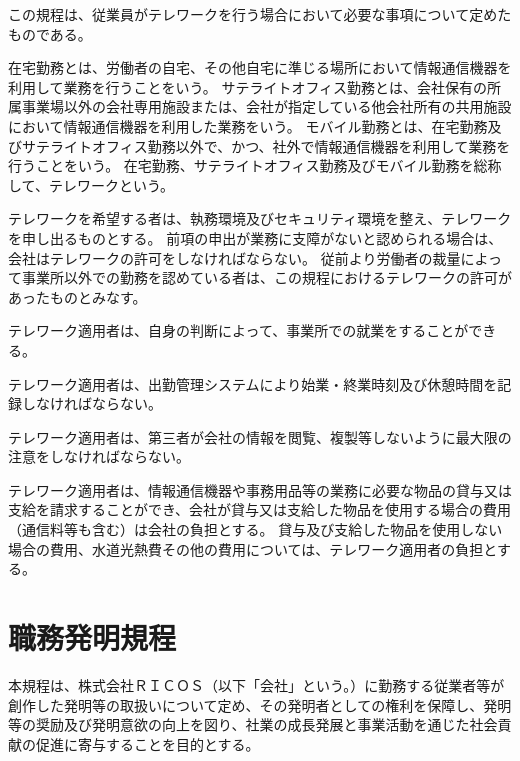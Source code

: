 \documentclass[10pt,a4paper,uplatex]{jsarticle}
\begin{document}
この規程は、従業員がテレワークを行う場合において必要な事項について定めたものである。

在宅勤務とは、労働者の自宅、その他自宅に準じる場所において情報通信機器を利用して業務を行うことをいう。
\term サテライトオフィス勤務とは、会社保有の所属事業場以外の会社専用施設または、会社が指定している他会社所有の共用施設において情報通信機器を利用した業務をいう。
\term モバイル勤務とは、在宅勤務及びサテライトオフィス勤務以外で、かつ、社外で情報通信機器を利用して業務を行うことをいう。
\term 在宅勤務、サテライトオフィス勤務及びモバイル勤務を総称して、テレワークという。

テレワークを希望する者は、執務環境及びセキュリティ環境を整え、テレワークを申し出るものとする。
\term 前項の申出が業務に支障がないと認められる場合は、会社はテレワークの許可をしなければならない。
\term 従前より労働者の裁量によって事業所以外での勤務を認めている者は、この規程におけるテレワークの許可があったものとみなす。

テレワーク適用者は、自身の判断によって、事業所での就業をすることができる。

テレワーク適用者は、出勤管理システムにより始業・終業時刻及び休憩時間を記録しなければならない。

テレワーク適用者は、第三者が会社の情報を閲覧、複製等しないように最大限の注意をしなければならない。

テレワーク適用者は、情報通信機器や事務用品等の業務に必要な物品の貸与又は支給を請求することができ、会社が貸与又は支給した物品を使用する場合の費用（通信料等も含む）は会社の負担とする。
\term 貸与及び支給した物品を使用しない場合の費用、水道光熱費その他の費用については、テレワーク適用者の負担とする。

\clearpage
\section{職務発明規程}

本規程は、株式会社ＲＩＣＯＳ（以下「会社」という。）に勤務する従業者等が創作した発明等の取扱いについて定め、その発明者としての権利を保障し、発明等の奨励及び発明意欲の向上を図り、社業の成長発展と事業活動を通じた社会貢献の促進に寄与することを目的とする。
\end{document}
